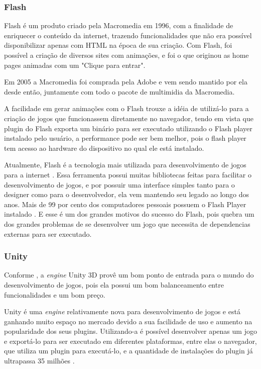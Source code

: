 \subsubsection{Flash}

Flash é um produto criado pela Macromedia em 1996, com a finalidade de
enriquecer o conteúdo da internet, trazendo funcionalidades que não
era possível disponibilizar apenas com HTML na época de sua criação.
Com Flash, foi possível a criação de diversos sites com animações, e
foi o que originou as home pages animadas com um "Clique para entrar".

Em 2005 a Macromedia foi comprada pela Adobe e vem sendo mantido por
ela desde então, juntamente com todo o pacote de multimidia da
Macromedia.

A facilidade em gerar animações com o Flash trouxe a idéia de
utilizá-lo para a criação de jogos que funcionassem diretamente no
navegador, tendo em vista que plugin do Flash exporta um binário para ser
executado utilizando o Flash player instalado pelo usuário, a
performance pode ser bem melhor, pois o flash player tem acesso ao
hardware do dispositivo no qual ele está instalado.

Atualmente, Flash é a tecnologia mais utilizada para desenvolvimento de jogos para a
internet \cite{website:adobeflashleading}. Essa ferramenta possui muitas
bibliotecas feitas para facilitar o desenvolvimento de jogos, e por
possuir uma interface simples tanto para o designer como para o desenvolvedor,
ela vem mantendo seu legado ao longo dos anos.
Mais de 99 por cento dos computadores pessoais possuem o Flash Player
instalado \cite{website:adobeflashpenetration}. E esse é um dos grandes
motivos do sucesso do Flash, pois quebra um dos grandes problemas de
se desenvolver um jogo que necessita de dependencias externas para ser
executado.

\subsubsection{Unity}

Conforme , a \textit{engine} Unity 3D provê
um bom ponto de entrada para o mundo do desenvolvimento de jogos, pois
ela possui um bom balanceamento entre funcionalidades e um bom preço.

Unity é uma \textit{engine} relativamente nova para desenvolvimento de jogos e está
ganhando muito espaço no mercado devido a sua facilidade de uso e
aumento na popularidade dos seus plugins. Utilizando-a é possível
desenvolver apenas um jogo e exportá-lo para ser executado em
diferentes plataformas, entre elas o navegador, que utiliza um
plugin para executá-lo, e a quantidade de instalações do plugin já
ultrapassa 35 milhões \cite{blackman2011beginning}.

